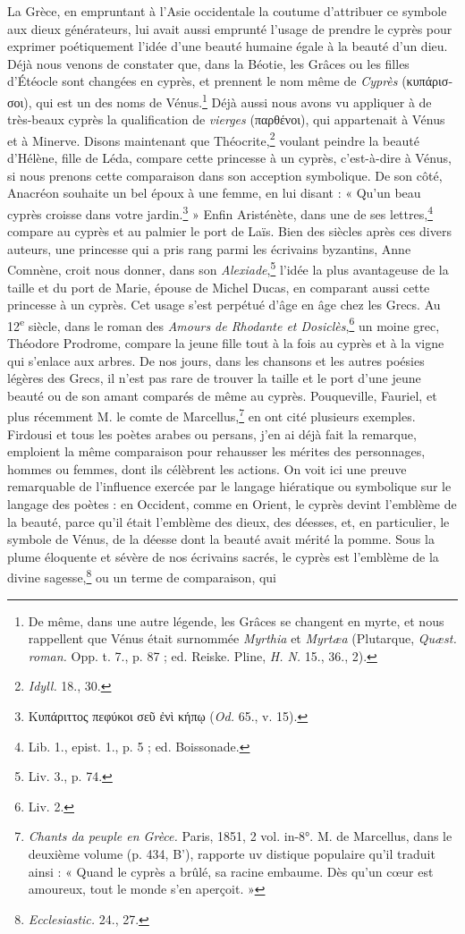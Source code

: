 \documentclass{article}
\begin{document}
La Grèce, en empruntant à l'Asie occidentale la coutume d'attribuer ce symbole aux dieux générateurs, lui avait aussi emprunté l'usage de prendre le cyprès pour exprimer poétiquement l'idée d'une beauté humaine égale à la beauté d'un dieu. Déjà nous venons de constater que, dans la Béotie, les Grâces ou les filles d'Étéocle sont changées en cyprès, et prennent le nom même de \emph{Cyprès} (\textgreek{κυπάρισσοι}), qui est un des noms de Vénus.\footnote{De même, dans une autre légende, les Grâces se changent en myrte, et nous rappellent que Vénus était surnommée \emph{Myrthia} et \emph{Myrtæa} (Plutarque, \emph{Quæst. roman.} Opp. t. 7., p. 87 ; ed. Reiske. Pline, \emph{H. N.} 15., 36., 2).} Déjà aussi nous avons vu appliquer à de très-beaux cyprès la qualification de \emph{vierges} (\textgreek{παρθένοι}), qui appartenait à Vénus et à Minerve. Disons maintenant que Théocrite,\footnote{\emph{Idyll.} 18., 30.} voulant peindre la beauté d'Hélène, fille de Léda, compare cette princesse à un cyprès, c'est-à-dire à Vénus, si nous prenons cette comparaison dans son acception symbolique. De son côté, Anacréon souhaite un bel époux à une femme, en lui disant : « Qu'un beau cyprès croisse dans votre jardin.\footnote{\textgreek{Κυπάριττος πεφύκοι σεῦ ἐνὶ κήπῳ} (\emph{Od.} 65., v. 15).} » Enfin Aristénète, dans une de ses lettres,\footnote{Lib. 1., epist. 1., p. 5 ; ed. Boissonade.} compare au cyprès et au palmier le port de Laïs. Bien des siècles après ces divers auteurs, une princesse qui a pris rang parmi les écrivains byzantins, Anne Comnène, croit nous donner, dans son \emph{Alexiade},\footnote{Liv. 3., p. 74.} l'idée la plus avantageuse de la taille et du port de Marie, épouse de Michel Ducas, en comparant aussi cette princesse à un cyprès. Cet usage s'est perpétué d'âge en âge chez les Grecs. Au 12\textsuperscript{e} siècle, dans le roman des \emph{Amours de Rhodante et Dosiclès},\footnote{Liv. 2.} un moine grec, Théodore Prodrome, compare la jeune fille tout à la fois au cyprès et à la vigne qui s'enlace aux arbres. De nos jours, dans les chansons et les autres poésies légères des Grecs, il n'est pas rare de trouver la taille et le port d'une jeune beauté ou de son amant comparés de même au cyprès. Pouqueville, Fauriel, et plus récemment M. le comte de Marcellus,\footnote{\emph{Chants da peuple en Grèce.} Paris, 1851, 2 vol. in-8°. M. de Marcellus, dans le deuxième volume (p. 434, B'), rapporte uv distique populaire qu'il traduit ainsi : « Quand le cyprès a brûlé, sa racine embaume. Dès qu'un cœur est amoureux, tout le monde s'en aperçoit. »} en ont cité plusieurs exemples. Firdousi et tous les poètes arabes ou persans, j'en ai déjà fait la remarque, emploient la même comparaison pour rehausser les mérites des personnages, hommes ou femmes, dont ils célèbrent les actions. On voit ici une preuve remarquable de l'influence exercée par le langage hiératique ou symbolique sur le langage des poètes : en Occident, comme en Orient, le cyprès devint l'emblème de la beauté, parce qu'il était l'emblème des dieux, des déesses, et, en particulier, le symbole de Vénus, de la déesse dont la beauté avait mérité la pomme. Sous la plume éloquente et sévère de nos écrivains sacrés, le cyprès est l'emblème de la divine sagesse,\footnote{\emph{Ecclesiastic.} 24., 27.} ou un terme de comparaison, qui 
\end{document}

